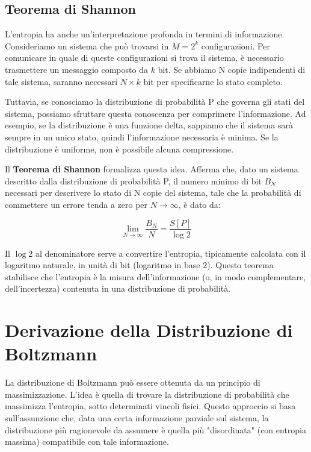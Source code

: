 \subsection{Teorema di Shannon}

L'entropia ha anche un'interpretazione profonda in termini di informazione. Consideriamo un sistema che può trovarsi in $M = 2^k$ configurazioni. Per comunicare in quale di queste configurazioni si trova il sistema, è necessario trasmettere un messaggio composto da $k$ bit. Se abbiamo N copie indipendenti di tale sistema, saranno necessari $N \times k$ bit per specificarne lo stato completo.

Tuttavia, se conosciamo la distribuzione di probabilità P che governa gli stati del sistema, possiamo sfruttare questa conoscenza per comprimere l'informazione. Ad esempio, se la distribuzione è una funzione delta, sappiamo che il sistema sarà sempre in un unico stato, quindi l'informazione necessaria è minima. Se la distribuzione è uniforme, non è possibile alcuna compressione.

Il \textbf{Teorema di Shannon} formalizza questa idea. Afferma che, dato un sistema descritto dalla distribuzione di probabilità P, il numero minimo di bit $B_N$ necessari per descrivere lo stato di N copie del sistema, tale che la probabilità di commettere un errore tenda a zero per $N \to \infty$, è dato da:

\begin{equation}
\lim_{N \to \infty} \frac{B_N}{N} = \frac{S[P]}{\log 2}
\end{equation}

Il $\log 2$ al denominatore serve a convertire l'entropia, tipicamente calcolata con il logaritmo naturale, in unità di bit (logaritmo in base 2). Questo teorema stabilisce che l'entropia è la misura dell'informazione (o, in modo complementare, dell'incertezza) contenuta in una distribuzione di probabilità.

\newpage
\section{Derivazione della Distribuzione di Boltzmann}

La distribuzione di Boltzmann può essere ottenuta da un principio di massimizzazione. L'idea è quella di trovare la distribuzione di probabilità che massimizza l'entropia, sotto determinati vincoli fisici. Questo approccio si basa sull'assunzione che, data una certa informazione parziale sul sistema, la distribuzione più ragionevole da assumere è quella più "disordinata" (con entropia massima) compatibile con tale informazione.

